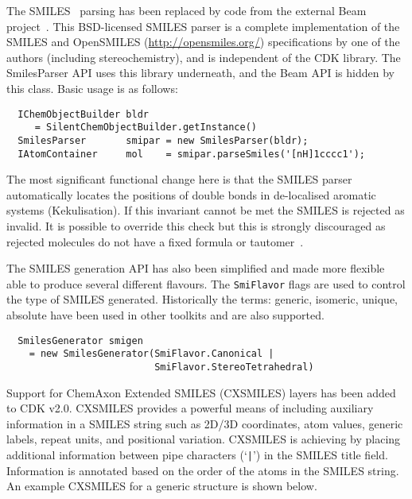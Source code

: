 \documentclass[doublespacing]{bmcart}
\def \cdkversion {v2.0}
\begin{document}
The SMILES~\cite{Weininger1988} parsing has been replaced by code from the external Beam project~\cite{Beam}.
This BSD-licensed SMILES parser is a complete implementation of the SMILES
and OpenSMILES (\url{http://opensmiles.org/}) specifications by one of the
authors (including stereochemistry), and is independent of
the CDK library. The SmilesParser API uses this library underneath, and the
Beam API is hidden by this class. Basic usage is as follows:

\vspace{0.2cm}
\begin{verbatim}
  IChemObjectBuilder bldr 
     = SilentChemObjectBuilder.getInstance()
  SmilesParser       smipar = new SmilesParser(bldr);
  IAtomContainer     mol    = smipar.parseSmiles('[nH]1cccc1');
\end{verbatim}
\vspace{0.2cm}

The most significant functional change here is that the SMILES parser 
automatically locates the positions of double bonds in de-localised aromatic 
systems (Kekulisation). If this invariant cannot be met the SMILES is rejected 
as invalid. It is possible to override this check but this is strongly 
discouraged as rejected molecules do not have a fixed formula or tautomer~\cite{May2015}.

The SMILES generation API has also been simplified and made more flexible able 
to produce several different flavours. The \texttt{SmiFlavor} flags are used
to control the type of SMILES generated. Historically the terms: generic, 
isomeric, unique, absolute have been used in other toolkits and are also 
supported.

\vspace{0.2cm}
\begin{verbatim}
  SmilesGenerator smigen
    = new SmilesGenerator(SmiFlavor.Canonical |
                          SmiFlavor.StereoTetrahedral)
\end{verbatim}
\vspace{0.2cm}

Support for ChemAxon Extended SMILES (CXSMILES)\cite{CXSMILES} layers has been added
to CDK \cdkversion{}. CXSMILES provides a powerful means of including auxiliary 
information in a SMILES string such as 2D/3D coordinates, atom values, generic labels, 
repeat units, and positional variation. CXSMILES is achieving by placing additional
information between pipe characters (`\texttt{|}') in the SMILES title field. Information
is annotated based on the order of the atoms in the SMILES string. An example CXSMILES
for a generic structure is shown below.
\end{document}
